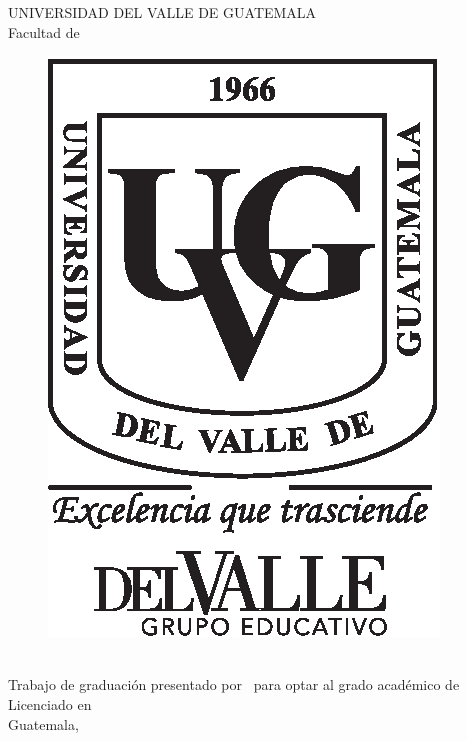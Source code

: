 \documentclass[11pt, letterpaper, twoside, openright]{report}
\newcommand{\blankpage}{
\newpage
\thispagestyle{empty}
\mbox{}
\newpage
}
\begin{document}
\ifdefined\CAPcaratula
	\newpage
    \cleardoublepage{}
	\pagecolor{white}
	\color{black}
	\setcounter{page}{1}
	\thispagestyle{empty}
	\begin{center}
		\LARGE UNIVERSIDAD DEL VALLE DE GUATEMALA\\
		\LARGE Facultad de \uvgfacultad \\[0.75cm]
	\end{center}
	\begin{figure}[h]
		\begin{center}
		\includegraphics[height=5.5 cm]{plantilla/escudoUVGnegro.eps}
		\vspace{0.5in}
		\end{center}
	\end{figure}
	\begin{center}
		\Large \textbf{\nohyphens{\titulotesis}} \\
		\vfill
		\Large \nohyphens{Trabajo de graduación presentado por \nombreestudiante \ para optar al grado académico de Licenciado en \uvgcarrera} \\
		\vfill
		\large Guatemala, \\
		\vspace{1em}
		\anoentrega
	\end{center}
    
    \ifdefined\printver	
	    \blankpage
	    \blankpage
	    
\end{document}
